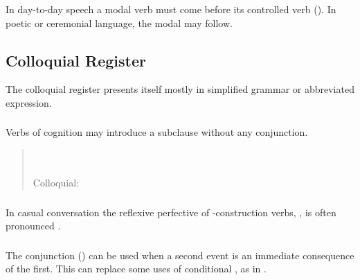\subsubsection{} In day-to-day speech a modal verb must come before
its controlled verb ().  In poetic or
ceremonial language, the modal may follow.


\subsection{Colloquial Register} The colloquial register presents
itself mostly in simplified grammar or abbreviated expression.

\subsubsection{} Verbs of cognition may introduce a subclause without
any conjunction.

\begin{quotation}
\noindent{}\\
\noindent{}\\
\noindent Colloquial: 
\end{quotation}

\subsubsection{} In casual conversation the reflexive perfective of
-construction verbs, , is often pronounced
.

\subsubsection{} The conjunction  () can be
used when a second event is an immediate con\-se\-quence of the first.  This
can replace some uses of conditional , as in  .

